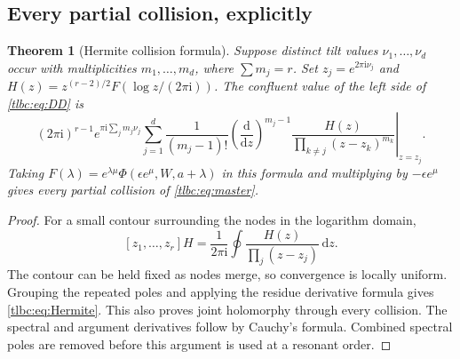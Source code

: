 \documentclass[11pt,letterpaper]{article}
\numberwithin{equation}{section}
\newtheorem{theorem}{Theorem}[section]
\theoremstyle{definition}\newtheorem{definition}[theorem]{Definition}
\theoremstyle{remark}\newtheorem{remark}[theorem]{Remark}
\newcommand{\dd}{\,\mathrm d}\newcommand{\ii}{\mathrm i}
\begin{document}
\subsection{Every partial collision, explicitly}
\begin{theorem}[Hermite collision formula]\label{tlbc:thm:Hermite}
Suppose distinct tilt values $\nu_1,\ldots,\nu_d$ occur with multiplicities $m_1,\ldots,m_d$, where $\sum m_j=r$. Set $z_j=e^{2\pi\ii\nu_j}$ and
$H(z)=z^{(r-2)/2}F(\log z/(2\pi\ii))$. The confluent value of the left side of \eqref{tlbc:eq:DD} is
\begin{equation}\label{tlbc:eq:Hermite}
 (2\pi\ii)^{r-1}e^{\pi\ii\sum_jm_j\nu_j}
 \sum_{j=1}^d\frac1{(m_j-1)!}
 \left.\left(\frac{\mathrm d}{\mathrm dz}\right)^{m_j-1}
 \frac{H(z)}{\prod_{k\ne j}(z-z_k)^{m_k}}\right|_{z=z_j}.
\end{equation}
Taking $F(\lambda)=e^{\lambda\mu}\Phi(\epsilon e^\mu,W,a+\lambda)$ in this formula and multiplying by $-\epsilon e^\mu$ gives every partial collision of \eqref{tlbc:eq:master}.
\end{theorem}
\begin{proof}
For a small contour surrounding the nodes in the logarithm domain,
\[
 [z_1,\ldots,z_r]H=\frac1{2\pi\ii}\oint
 \frac{H(z)}{\prod_j(z-z_j)}\dd z.
\]
The contour can be held fixed as nodes merge, so convergence is locally uniform. Grouping the repeated poles and applying the residue derivative formula gives \eqref{tlbc:eq:Hermite}. This also proves joint holomorphy through every collision. The spectral and argument derivatives follow by Cauchy's formula. Combined spectral poles are removed before this argument is used at a resonant order.
\end{proof}
\end{document}
